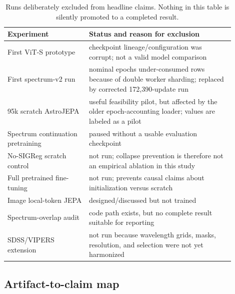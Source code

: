 \documentclass{article}
\begin{document}
\begin{table}[h]
\centering
\caption{Runs deliberately excluded from headline claims. Nothing in this table
is silently promoted to a completed result.}
\label{tab:incomplete}
\small
\begin{tabular}{p{0.32\linewidth}p{0.58\linewidth}}
\toprule
Experiment & Status and reason for exclusion\\
\midrule
First ViT-S prototype & checkpoint lineage/configuration was corrupt; not a
valid model comparison\\
First spectrum-v2 run & nominal epochs under-consumed rows because of double
worker sharding; replaced by corrected 172,390-update run\\
95k scratch AstroJEPA & useful feasibility pilot, but affected by the older
epoch-accounting loader; values are labeled as a pilot\\
Spectrum continuation pretraining & paused without a usable evaluation
checkpoint\\
No-SIGReg scratch control & not run; collapse prevention is therefore not an
empirical ablation in this study\\
Full pretrained fine-tuning & not run; prevents causal claims about
initialization versus scratch\\
Image local-token JEPA & designed/discussed but not trained\\
Spectrum-overlap audit & code path exists, but no complete result suitable for
reporting\\
SDSS/VIPERS extension & not run because wavelength grids, masks, resolution,
and selection were not yet harmonized\\
\bottomrule
\end{tabular}
\end{table}

\subsection{Artifact-to-claim map}
\end{document}
